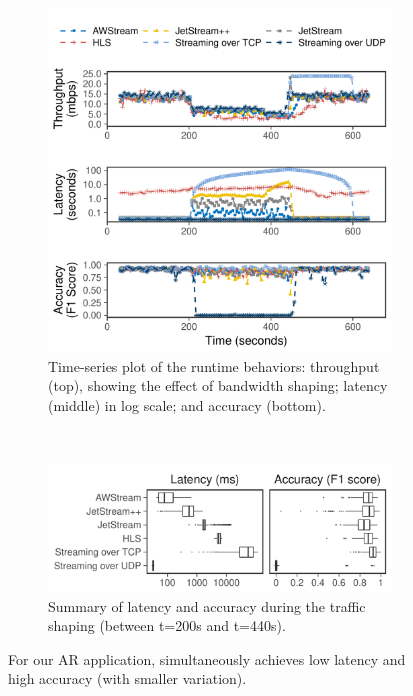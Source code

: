 \begin{figure}[t]
  \begin{subfigure}[t]{\columnwidth}
    \centering
    \includegraphics[width=\columnwidth]{figures/runtime_darknet-timeseries.pdf}
    \caption{Time-series plot of the runtime behaviors: throughput (top),
      showing the effect of bandwidth shaping; latency (middle) in log scale;
      and accuracy (bottom).}
    \label{fig:ar-runtime-timeseries}
  \end{subfigure}
  \vspace{1em}
  \\
  \begin{subfigure}[t]{\columnwidth}
    \centering
    \includegraphics[width=\columnwidth]{figures/runtime_darknet-boxplot.pdf}
    \caption{Summary of latency and accuracy during the traffic shaping (between
      t=200s and t=440s).}
    \label{fig:ar-runtime-boxplot}
  \end{subfigure}
  \caption{For our AR application, \sysname{} simultaneously achieves low
    latency and high accuracy (with smaller variation).}
  \label{fig:ar-runtime}
\end{figure}

